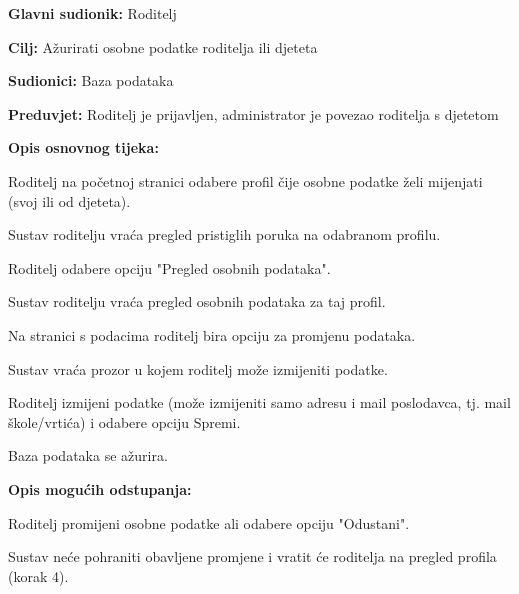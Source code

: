 					\noindent {}
					\begin{packed_item}
						
						\item \textbf{Glavni sudionik: }Roditelj
						\item  \textbf{Cilj:} Ažurirati osobne podatke roditelja ili djeteta
						\item  \textbf{Sudionici:} Baza podataka
						\item  \textbf{Preduvjet:} Roditelj je prijavljen, administrator je povezao roditelja s djetetom
						\item  \textbf{Opis osnovnog tijeka:}
						
						\item[] \begin{packed_enum}
							
							\item Roditelj na početnoj stranici odabere profil čije osobne podatke želi mijenjati (svoj ili od djeteta).
							\item Sustav roditelju vraća pregled pristiglih poruka na odabranom profilu. 
							\item Roditelj odabere opciju "Pregled osobnih podataka".
							\item Sustav roditelju vraća pregled osobnih podataka za taj profil.
							\item Na stranici s podacima roditelj bira opciju za promjenu podataka.
							\item Sustav vraća prozor u kojem roditelj može izmijeniti podatke.
							\item Roditelj izmijeni podatke (može izmijeniti samo adresu i mail poslodavca, tj. mail škole/vrtića) i odabere opciju Spremi.
							\item Baza podataka se ažurira.
						\end{packed_enum}
						
						\item  \textbf{Opis mogućih odstupanja:}
						
						\item[] \begin{packed_item}
							
							\item[7.a] Roditelj promijeni osobne podatke ali odabere opciju "Odustani".
							\item[] \begin{packed_enum}
								
								\item Sustav neće pohraniti obavljene promjene i vratit će roditelja na pregled profila (korak 4).
							\end{packed_enum}
							
						\end{packed_item}
					\end{packed_item}
					
